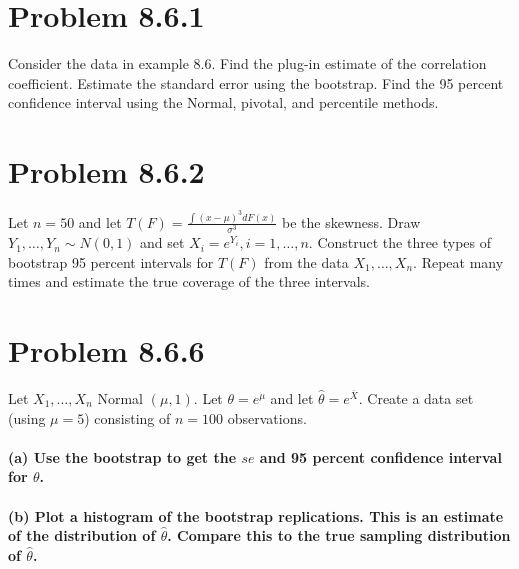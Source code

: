 \documentclass{article}\usepackage[]{graphicx}\usepackage[]{color}
\begin{document}
\section{Problem 8.6.1}
Consider the data in example 8.6. Find the plug-in estimate of the correlation coefficient. Estimate the standard error using the bootstrap. Find the 95 percent confidence interval using the Normal, pivotal, and percentile methods.




\section{Problem 8.6.2}
Let $n = 50$ and let $T(F) = \frac{\int (x - \mu)^{3}dF(x)}{\sigma^{3}}$ be the skewness. Draw $Y_{1}, \ldots, Y_{n} \sim N(0,1)$ and set $X_{i} = e^{Y_{i}}, i = 1, \ldots, n$. Construct the three types of bootstrap 95 percent intervals for $T(F)$ from the data $X_{1}, \ldots, X_{n}$. Repeat many times and estimate the true coverage of the three intervals. 



\section{Problem 8.6.6}
Let $X_{1}, \ldots, X_{n}$ Normal $(\mu,1)$. Let $\theta = e^{\mu}$ and let $\hat{\theta} = e^{\overline{X}}$. Create a data set (using $\mu = 5$) consisting of $n = 100$ observations.

\paragraph*{(a) Use the bootstrap to get the $se$ and 95 percent confidence interval for $\theta$.}


\paragraph*{(b) Plot a histogram of the bootstrap replications. This is an estimate of the distribution of $\hat{\theta}$. Compare this to the true sampling distribution of $\hat{\theta}$.}
\end{document}
